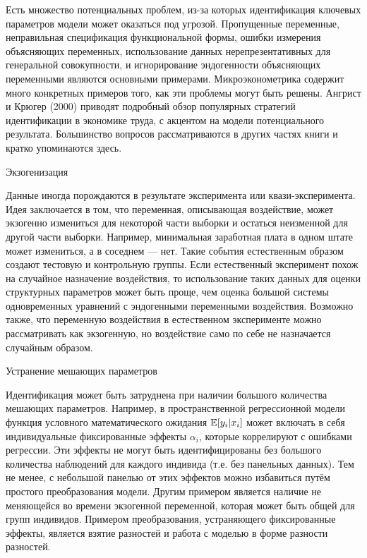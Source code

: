 Есть множество потенциальных проблем, из-за  которых идентификация ключевых параметров модели может оказаться под угрозой. Пропущенные переменные, неправильная спецификация функциональной формы, ошибки  измерения объясняющих переменных, использование данных нерепрезентативных для генеральной совокупности, и игнорирование эндогенности объясняющих переменными являются основными примерами. Микроэконометрика содержит много конкретных примеров того, как эти проблемы могут быть решены. Ангрист и Крюгер (2000) приводят подробный обзор популярных стратегий идентификации в экономике труда, с акцентом на модели потенциального результата. Большинство вопросов рассматриваются в других частях книги и кратко упоминаются здесь.


\begin{center}
Экзогенизация
\end{center}

Данные иногда порождаются в результате эксперимента или квази-эксперимента. Идея заключается в том, что переменная, описывающая воздействие, может экзогенно измениться для некоторой части выборки и остаться неизменной для другой части выборки. Например,  минимальная заработная плата в одном штате может измениться, а в соседнем --- нет. Такие события естественным образом создают тестовую и контрольную группы. Если естественный эксперимент похож на случайное назначение воздействия, то использование таких данных для оценки структурных параметров может быть проще, чем оценка большой системы одновременных уравнений с эндогенными переменными воздействия. Возможно также, что переменную воздействия в естественном эксперименте можно рассматривать как экзогенную, но воздействие само по себе не назначается случайным образом.


\begin{center}
Устранение мешающих параметров
\end{center}

Идентификация может быть затруднена при наличии большого количества мешающих параметров. Например, в пространственной регрессионной модели функция условного математического ожидания $\mathbb{E}[y_{i}|x_{i}]$ может включать в себя индивидуальные фиксированные эффекты $\alpha_{i}$, которые коррелируют с ошибками регрессии. 
Эти эффекты не могут быть идентифицированы без большого количества наблюдений для каждого индивида (т.е. без панельных данных). Тем не менее, с небольшой панелью от этих эффектов можно  избавиться путём простого преобразования модели. Другим примером является наличие не меняющейся во времени экзогенной переменной, которая может быть общей для групп индивидов. Примером преобразования, устраняющего фиксированные эффекты, является взятие разностей и работа с моделью в форме разности разностей.


